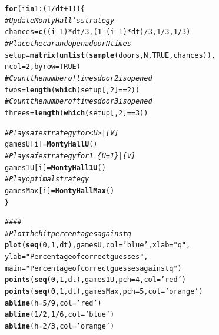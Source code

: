 \documentclass[twoside,a4paper]{article}
\makeatletter
\theoremstyle{plain}
\theoremstyle{definition}
\theoremstyle{remark}
\numberwithin{equation}{section}
\newcommand{\hlnum}[1]{\textcolor[rgb]{0.686,0.059,0.569}{#1}}%
\newcommand{\hlstr}[1]{\textcolor[rgb]{0.192,0.494,0.8}{#1}}%
\newcommand{\hlcom}[1]{\textcolor[rgb]{0.678,0.584,0.686}{\textit{#1}}}%
\newcommand{\hlopt}[1]{\textcolor[rgb]{0,0,0}{#1}}%
\newcommand{\hlstd}[1]{\textcolor[rgb]{0.345,0.345,0.345}{#1}}%
\newcommand{\hlkwa}[1]{\textcolor[rgb]{0.161,0.373,0.58}{\textbf{#1}}}%
\newcommand{\hlkwb}[1]{\textcolor[rgb]{0.69,0.353,0.396}{#1}}%
\newcommand{\hlkwc}[1]{\textcolor[rgb]{0.333,0.667,0.333}{#1}}%
\newcommand{\hlkwd}[1]{\textcolor[rgb]{0.737,0.353,0.396}{\textbf{#1}}}%
\newenvironment{kframe}{%
 \def\at@end@of@kframe{}%
 \ifinner\ifhmode%
  \def\at@end@of@kframe{\end{minipage}}%
  \begin{minipage}{\columnwidth}%
 \fi\fi%
 \def\FrameCommand##1{\hskip\@totalleftmargin \hskip-\fboxsep
 \colorbox{shadecolor}{##1}\hskip-\fboxsep
     \hskip-\linewidth \hskip-\@totalleftmargin \hskip\columnwidth}%
 \MakeFramed {\advance\hsize-\width
   \@totalleftmargin\z@ \linewidth\hsize
   \@setminipage}}%
 {\par\unskip\endMakeFramed%
 \at@end@of@kframe}
\newenvironment{knitrout}{}{} %
\DeclareMathOperator{\1}{\mathbbm{1}}
\makeatother
\begin{document}
\begin{knitrout}
\begin{kframe}
\begin{alltt}
\hlkwa{for} \hlstd{(i} \hlkwa{in} \hlnum{1}\hlopt{:}\hlstd{(}\hlnum{1}\hlopt{/}\hlstd{dt}\hlopt{+}\hlnum{1}\hlstd{)) \{}
  \hlcom{# Update Monty Hall's strategy}
  \hlstd{chances} \hlkwb{=} \hlkwd{c}\hlstd{((i}\hlopt{-}\hlnum{1}\hlstd{)}\hlopt{*}\hlstd{dt}\hlopt{/}\hlnum{3}\hlstd{, (}\hlnum{1}\hlopt{-}\hlstd{(i}\hlopt{-}\hlnum{1}\hlstd{)}\hlopt{*}\hlstd{dt)}\hlopt{/}\hlnum{3}\hlstd{,} \hlnum{1}\hlopt{/}\hlnum{3}\hlstd{,} \hlnum{1}\hlopt{/}\hlnum{3}\hlstd{)}
  \hlcom{# Place the car and open a door N times}
  \hlstd{setup} \hlkwb{=} \hlkwd{matrix}\hlstd{(}\hlkwd{unlist}\hlstd{(}\hlkwd{sample}\hlstd{(doors, N,} \hlnum{TRUE}\hlstd{, chances)),}
                 \hlkwc{ncol} \hlstd{=} \hlnum{2}\hlstd{,} \hlkwc{byrow} \hlstd{=} \hlnum{TRUE}\hlstd{)}
  \hlcom{# Count the number of times door 2 is opened}
  \hlstd{twos} \hlkwb{=} \hlkwd{length}\hlstd{(}\hlkwd{which}\hlstd{(setup[,}\hlnum{2}\hlstd{]} \hlopt{==} \hlnum{2}\hlstd{))}
  \hlcom{# Count the number of times door 3 is opened}
  \hlstd{threes} \hlkwb{=} \hlkwd{length}\hlstd{(}\hlkwd{which}\hlstd{(setup[,}\hlnum{2}\hlstd{]} \hlopt{==} \hlnum{3}\hlstd{))}

  \hlcom{# Play safe strategy for <U>|[V]}
  \hlstd{gamesU[i]} \hlkwb{=} \hlkwd{MontyHallU}\hlstd{()}
  \hlcom{# Play safe strategy for 1_\{U=1\}|[V]}
  \hlstd{games1U[i]} \hlkwb{=} \hlkwd{MontyHall1U}\hlstd{()}
  \hlcom{# Play optimal strategy}
  \hlstd{gamesMax[i]} \hlkwb{=} \hlkwd{MontyHallMax}\hlstd{()}
\hlstd{\}}

\hlcom{####}
\hlcom{# Plot the hit percentages against q}
\hlkwd{plot}\hlstd{(}\hlkwd{seq}\hlstd{(}\hlnum{0}\hlstd{,}\hlnum{1}\hlstd{,dt), gamesU,} \hlkwc{col}\hlstd{=}\hlstr{'blue'}\hlstd{,} \hlkwc{xlab}\hlstd{=}\hlstr{"q"}\hlstd{,}
     \hlkwc{ylab}\hlstd{=}\hlstr{"Percentage of correct guesses"}\hlstd{,}
     \hlkwc{main}\hlstd{=}\hlstr{"Percentage of correct guesses against q"}\hlstd{)}
\hlkwd{points}\hlstd{(}\hlkwd{seq}\hlstd{(}\hlnum{0}\hlstd{,}\hlnum{1}\hlstd{,dt), games1U,} \hlkwc{pch}\hlstd{=}\hlnum{4}\hlstd{,} \hlkwc{col}\hlstd{=}\hlstr{'red'}\hlstd{)}
\hlkwd{points}\hlstd{(}\hlkwd{seq}\hlstd{(}\hlnum{0}\hlstd{,}\hlnum{1}\hlstd{,dt), gamesMax,} \hlkwc{pch}\hlstd{=}\hlnum{5}\hlstd{,} \hlkwc{col}\hlstd{=}\hlstr{'orange'}\hlstd{)}
\hlkwd{abline}\hlstd{(}\hlkwc{h}\hlstd{=}\hlnum{5}\hlopt{/}\hlnum{9}\hlstd{,} \hlkwc{col}\hlstd{=}\hlstr{'red'}\hlstd{)}
\hlkwd{abline}\hlstd{(}\hlnum{1}\hlopt{/}\hlnum{2}\hlstd{,}\hlnum{1}\hlopt{/}\hlnum{6}\hlstd{,} \hlkwc{col}\hlstd{=}\hlstr{'blue'}\hlstd{)}
\hlkwd{abline}\hlstd{(}\hlkwc{h}\hlstd{=}\hlnum{2}\hlopt{/}\hlnum{3}\hlstd{,} \hlkwc{col}\hlstd{=}\hlstr{'orange'}\hlstd{)}
\end{alltt}
\end{kframe}
\end{knitrout}
\newpage
\end{document}
